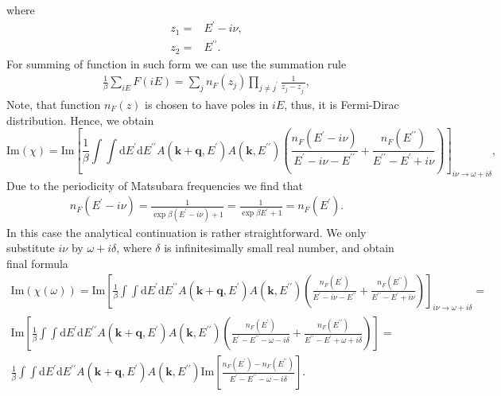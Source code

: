 \documentclass[preprint,prb,amsmath,superscriptaddress,showpacs]{revtex4}
\begin{document}
%
 where
%
 \begin{align*}
    z_1 =& E^{\prime} - i\nu, \\
    z_2 =& E^{\prime \prime}.
 \end{align*}
%
For summing of function in such form we can use the summation rule
 \begin{align}
     \frac{1}{\beta} \sum_{iE} F(iE) = \sum_j n_F(z_j) \prod\limits_{j\neq j^{\prime}} \frac{1}{z_j - z_{j^{\prime}}},
 \end{align}
Note, that function $n_F(z)$ is chosen to have poles in $iE$, thus, it is
Fermi-Dirac distribution. Hence, we obtain
%
\begin{equation}
       \mathrm{Im} (\chi) =  \mathrm{Im}\left[ \frac{1}{\beta} \int \int
      \mathrm{d}E^{\prime} \mathrm{d}E^{\prime \prime} A(\mathbf{k} +
      \mathbf{q}, E^{\prime}) A(\mathbf{k}, E^{\prime \prime}) \left(
        \frac{n_F(E^{\prime} - i\nu)}{E^{\prime} - i\nu - E^{\prime
            \prime}} +  \frac{n_F(E^{\prime \prime})}{E^{\prime
            \prime} - E^{\prime} + i\nu}  \right)
  \right]_{i\nu \rightarrow \omega + i\delta},
\end{equation}
%
Due to the periodicity of Matsubara frequencies we find that
%
\begin{align*}
    n_F(E^{\prime} - i\nu) = \frac{1}{\exp{\beta (E^{\prime} - i\nu)} + 1} = \frac{1}{\exp{\beta E^{\prime}} + 1} = n_F(E^{\prime}).
\end{align*}
%
In this case the analytical continuation is rather straightforward. We only substitute $i\nu$ by $ \omega + i\delta$, where $\delta$ is infinitesimally small real number, and obtain final formula 
%
\begin{equation}
    \begin{gathered}
    \mathrm{Im} (\chi(\omega)) = \mathrm{Im}\left[ \frac{1}{\beta} \int \int
      \mathrm{d}E^{\prime} \mathrm{d}E^{\prime \prime} A(\mathbf{k} +
      \mathbf{q}, E^{\prime}) A(\mathbf{k}, E^{\prime \prime}) \left(
        \frac{n_F(E^{\prime})}{E^{\prime} - i\nu - E^{\prime
            \prime}} +  \frac{n_F(E^{\prime \prime})}{E^{\prime
            \prime} - E^{\prime} + i\nu}  \right) \right]_{i\nu \rightarrow \omega + i\delta}  = \\
    \mathrm{Im}\left[ \frac{1}{\beta} \int \int
      \mathrm{d}E^{\prime} \mathrm{d}E^{\prime \prime} A(\mathbf{k} +
      \mathbf{q}, E^{\prime}) A(\mathbf{k}, E^{\prime \prime}) \left(
        \frac{n_F(E^{\prime})}{E^{\prime} - E^{\prime \prime} - \omega - i\delta} +  \frac{n_F(E^{\prime \prime})}{E^{\prime
            \prime} - E^{\prime} + \omega +  i\delta}  \right)
    \right] = \\
     \frac{1}{\beta} \int \int
      \mathrm{d}E^{\prime} \mathrm{d}E^{\prime \prime} A(\mathbf{k} +
      \mathbf{q}, E^{\prime}) A(\mathbf{k}, E^{\prime \prime})
      \mathrm{Im} \left[
        \frac{n_F(E^{\prime}) - n_F(E^{\prime \prime})}{E^{\prime} - E^{\prime \prime} - \omega - i\delta}\right].
    \end{gathered}
\end{equation}
\end{document}
